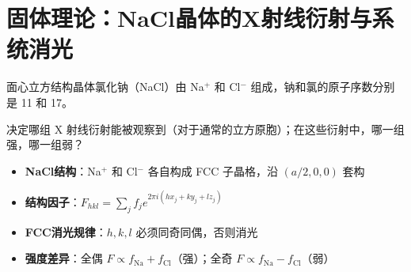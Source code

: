 \section{固体理论：NaCl晶体的X射线衍射与系统消光}
\label{sec:nacl-diffraction}

\begin{modelbox}[题目：NaCl衍射峰的选择定则与强度比较]
面心立方结构晶体氯化钠（NaCl）由 Na$^+$ 和 Cl$^-$ 组成，钠和氯的原子序数分别是 11 和 17。

决定哪组 X 射线衍射能被观察到（对于通常的立方原胞）；在这些衍射中，哪一组强，哪一组弱？
\end{modelbox}

\begin{tipbox}[考点快速分析]
\begin{itemize}
    \item \textbf{NaCl结构}：Na$^+$ 和 Cl$^-$ 各自构成 FCC 子晶格，沿 $(a/2,0,0)$ 套构
    \item \textbf{结构因子}：$F_{hkl}=\sum_j f_j e^{2\pi i(hx_j+ky_j+lz_j)}$
    \item \textbf{FCC消光规律}：$h,k,l$ 必须同奇同偶，否则消光
    \item \textbf{强度差异}：全偶 $F\propto f_{\text{Na}}+f_{\text{Cl}}$（强）；全奇 $F\propto f_{\text{Na}}-f_{\text{Cl}}$（弱）
\end{itemize}
\end{tipbox}


